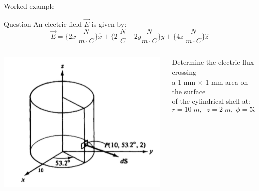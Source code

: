 {
\problemslide

%
%
%

\begin{frame}{Worked example}

  \begin{blockexmplque}{Question}
    An electric field $\vec{E}$ is given by:
    \begin{equation*}
     \vec{E} =
      \big\{ 2x \; \frac{N}{m \cdot C} \big\} \hat{x} +
      \big\{ 2 \; \frac{N}{C} - 2y \frac{N}{m \cdot C} \big\} \hat{y} +
      \big\{ 4z \; \frac{N}{m \cdot C} \big\} \hat{z}
    \end{equation*}
    \vspace{-0.3cm}
    \begin{columns}
      \begin{column}{0.47\textwidth}
        \begin{center}
          \includegraphics[width=0.99\textwidth]{./images/problems/lect02_electric_flux_area_on_cylinder.png}\\
        \end{center}
      \end{column}
      \begin{column}{0.53\textwidth}
        Determine the electric flux crossing \\
        a 1 mm $\times$ 1 mm area on the surface \\
        of the cylindrical shell at:
        \begin{equation*}
          r = 10 \; m, \;\; z = 2 \; m, \; \phi = 53.2^{o}
        \end{equation*}
     \end{column}
   \end{columns}
  \end{blockexmplque}
  \vspace{0.4cm}


\end{frame}}
